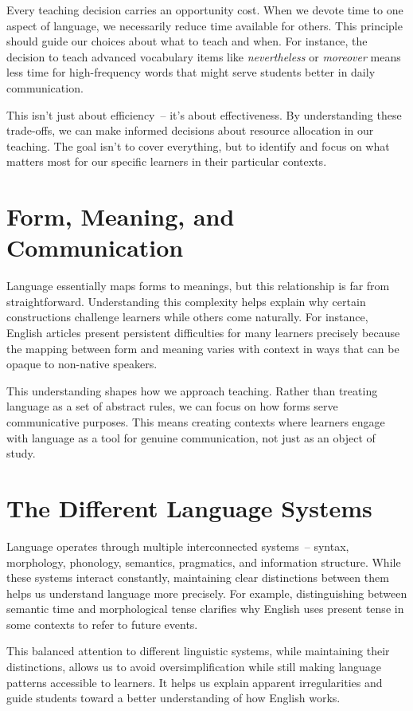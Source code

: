 Every teaching decision carries an opportunity cost. When we devote time to one aspect of language, we necessarily reduce time available for others. This principle should guide our choices about what to teach and when. For instance, the decision to teach advanced vocabulary items like \textit{nevertheless} or \textit{moreover} means less time for high-frequency words that might serve students better in daily communication.

This isn't just about efficiency~-- it's about effectiveness. By understanding these trade-offs, we can make informed decisions about resource allocation in our teaching. The goal isn't to cover everything, but to identify and focus on what matters most for our specific learners in their particular contexts.

\section*{Form, Meaning, and Communication}

Language essentially maps forms to meanings, but this relationship is far from straightforward. Understanding this complexity helps explain why certain constructions challenge learners while others come naturally. For instance, English articles present persistent difficulties for many learners precisely because the mapping between form and meaning varies with context in ways that can be opaque to non-native speakers.

This understanding shapes how we approach teaching. Rather than treating language as a set of abstract rules, we can focus on how forms serve communicative purposes. This means creating contexts where learners engage with language as a tool for genuine communication, not just as an object of study.

\section*{The Different Language Systems}

Language operates through multiple interconnected systems~-- syntax, morphology, phonology, semantics, pragmatics, and information structure. While these systems interact constantly, maintaining clear distinctions between them helps us understand language more precisely. For example, distinguishing between semantic time and morphological tense clarifies why English uses present tense in some contexts to refer to future events.

This balanced attention to different linguistic systems, while maintaining their distinctions, allows us to avoid oversimplification while still making language patterns accessible to learners. It helps us explain apparent irregularities and guide students toward a better understanding of how English works.

